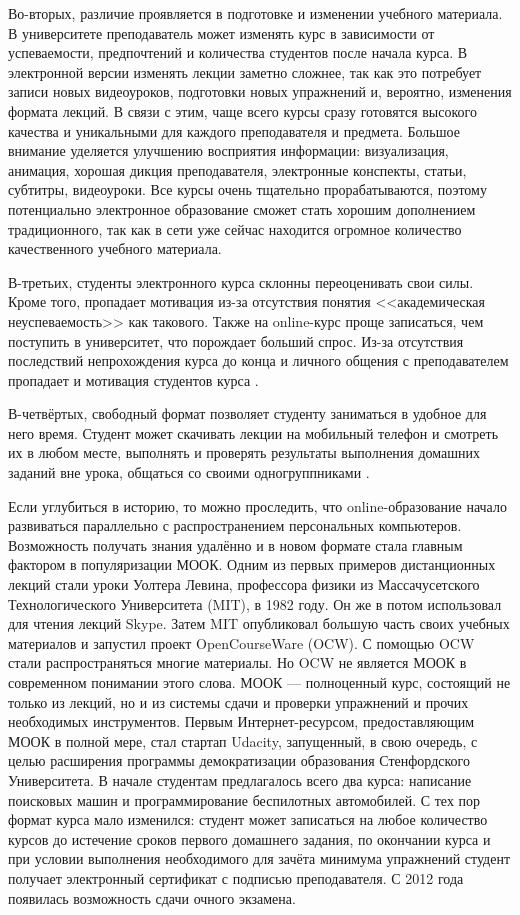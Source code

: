 \documentclass{matmex-diploma-custom}
\begin{document}
Во-вторых, различие проявляется в подготовке и изменении учебного
материала. В университете преподаватель может изменять курс в
зависимости от успеваемости, предпочтений и количества студентов после
начала курса. В электронной версии изменять лекции заметно сложнее,
так как это потребует записи новых видеоуроков, подготовки новых
упражнений и, вероятно, изменения формата лекций. В связи с этим, чаще
всего курсы сразу готовятся высокого качества и уникальными для
каждого преподавателя и предмета. Большое внимание уделяется улучшению
восприятия информации: визуализация, анимация, хорошая дикция
преподавателя, электронные конспекты, статьи, субтитры,
видеоуроки. Все курсы очень тщательно прорабатываются, поэтому
потенциально электронное образование сможет стать хорошим дополнением
традиционного, так как в сети уже сейчас находится огромное количество
качественного учебного материала.

В-третьих, студенты электронного курса склонны переоценивать свои
силы. Кроме того, пропадает мотивация из-за отсутствия понятия <<академическая
неуспеваемость>> как такового. Также на online-курс
проще записаться, чем поступить в университет, что порождает больший
спрос. Из-за отсутствия последствий непрохождения курса до конца и личного
общения с преподавателем пропадает и мотивация студентов курса \cite{Clow}.

В-четвёртых, свободный формат позволяет студенту заниматься в
удобное для него время. Студент может скачивать лекции на мобильный
телефон и смотреть их в любом месте, выполнять и проверять результаты
выполнения домашних заданий вне урока, общаться со своими
одногруппниками \cite{mak2010blogs}.

Если углубиться в историю, то можно проследить, что online-образование
начало развиваться параллельно с распространением персональных
компьютеров. Возможность получать знания удалённо и в новом формате
стала главным фактором в популяризации МООК. Одним из первых примеров
дистанционных лекций стали уроки Уолтера Левина, профессора физики из
Массачусетского Технологического Университета (MIT), в 1982 году. Он
же в потом использовал для чтения лекций Skype. Затем MIT опубликовал
большую часть своих учебных материалов и запустил проект
OpenCourseWare (OCW). С помощью OCW стали распространяться многие
материалы. Но OCW не является МООК в современном понимании этого
слова. МООК --- полноценный курс, состоящий не только из лекций, но и
из системы сдачи и проверки упражнений и прочих необходимых
инструментов. Первым Интернет-ресурсом, предоставляющим МООК в полной
мере, стал стартап Udacity, запущенный, в свою очередь, с целью
расширения программы демократизации образования Стенфордского
Университета. В начале студентам предлагалось всего два курса:
написание поисковых машин и программирование беспилотных
автомобилей. С тех пор формат курса мало изменился: студент может
записаться на любое количество курсов до истечение сроков первого
домашнего задания, по окончании курса и при условии выполнения
необходимого для зачёта минимума упражнений студент получает
электронный сертификат с подписью преподавателя. С 2012 года появилась
возможность сдачи очного экзамена.
\end{document}
